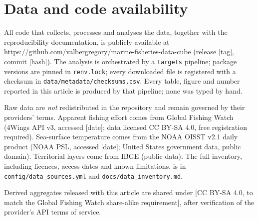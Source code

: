 
\section*{Data and code availability}
All code that collects, processes and analyses the data, together with the
reproducibility documentation, is publicly available at
\url{https://github.com/valbergregory/marine-fisheries-data-cube}
(release [tag], commit [hash]). The analysis is orchestrated by a
\texttt{targets} pipeline; package versions are pinned in \texttt{renv.lock};
every downloaded file is registered with a checksum in
\texttt{data/metadata/checksums.csv}. Every table, figure and number reported
in this article is produced by that pipeline; none was typed by hand.

Raw data are \emph{not} redistributed in the repository and remain governed by
their providers' terms. Apparent fishing effort comes from Global Fishing Watch
(4Wings API v3, accessed [date]; data licensed CC BY-SA 4.0, free registration
required). Sea-surface temperature comes from the NOAA OISST v2.1 daily product
(NOAA PSL, accessed [date]; United States government data, public domain).
Territorial layers come from IBGE (public data). The full inventory, including
licences, access dates and known limitations, is in
\texttt{config/data\_sources.yml} and \texttt{docs/data\_inventory.md}.

Derived aggregates released with this article are shared under
[CC BY-SA 4.0, to match the Global Fishing Watch share-alike requirement],
after verification of the provider's API terms of service.
